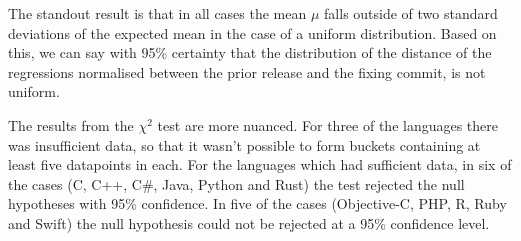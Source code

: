 \documentclass[pdflatex, sn-mathphys, referee]{sn-jnl}%
\theoremstyle{thmstyleone}%
\theoremstyle{thmstyletwo}%
\theoremstyle{thmstylethree}%
\theoremstyle{thmstyleone}
\begin{document}
The standout result is that in all cases the mean $\mu$ falls outside of two standard deviations of the expected mean in the case of a uniform distribution. Based on this, we can say with 95\% certainty that the distribution of the distance of the regressions normalised between the prior release and the fixing commit, is not uniform.

The results from the $\chi^2$ test are more nuanced. For three of the languages there was insufficient data, so that it wasn't possible to form buckets containing at least five datapoints in each. For the languages which had sufficient data, in six of the cases (C, C++, C\#, Java, Python and Rust) the test rejected the null hypotheses with 95\% confidence. In five of the cases (Objective-C, PHP, R, Ruby and Swift) the null hypothesis could not be rejected at a 95\% confidence level.
\end{document}
